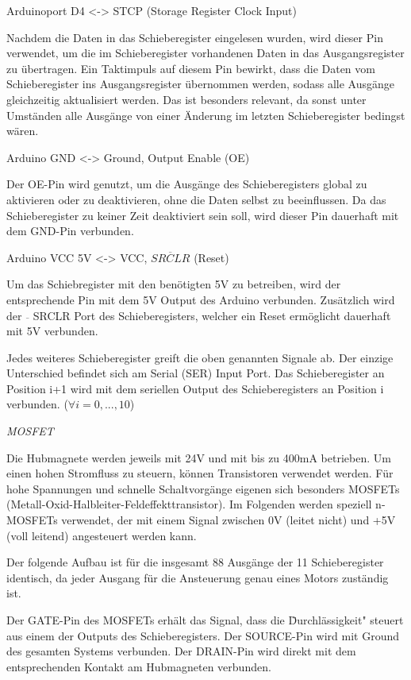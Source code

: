 Arduinoport D4 <-> STCP (Storage Register Clock Input)

Nachdem die Daten in das Schieberegister eingelesen wurden, wird dieser Pin verwendet, um die im Schieberegister vorhandenen Daten in das Ausgangsregister zu übertragen.
Ein Taktimpuls auf diesem Pin bewirkt, dass die Daten vom Schieberegister ins Ausgangsregister übernommen werden, sodass alle Ausgänge gleichzeitig aktualisiert werden.
Das ist besonders relevant, da sonst unter Umständen alle Ausgänge von einer Änderung im letzten Schieberegister bedingst wären.

Arduino GND <-> Ground, Output Enable (OE)

Der OE-Pin wird genutzt, um die Ausgänge des Schieberegisters global zu aktivieren oder zu deaktivieren, ohne die Daten selbst zu beeinflussen.
Da das Schieberegister zu keiner Zeit deaktiviert sein soll, wird dieser Pin dauerhaft mit dem GND-Pin verbunden.

Arduino VCC 5V <-> VCC, $\overline{SRCLR}$ (Reset)

Um das Schiebregister mit den benötigten 5V zu betreiben, wird der entsprechende Pin mit dem 5V Output des Arduino verbunden.
Zusätzlich wird der $\overline{ }$ SRCLR Port des Schieberegisters, welcher ein Reset ermöglicht dauerhaft mit 5V verbunden.

Jedes weiteres Schieberegister greift die oben genannten Signale ab.
Der einzige Unterschied befindet sich am Serial (SER) Input Port.
Das Schieberegister an Position i+1 wird mit dem seriellen Output des Schieberegisters an Position i verbunden. ($\forall i = 0,...,10$)

\textit{MOSFET}

Die Hubmagnete werden jeweils mit 24V und mit bis zu 400mA betrieben.
Um einen hohen Stromfluss zu steuern, können Transistoren verwendet werden.
Für hohe Spannungen und schnelle Schaltvorgänge eigenen sich besonders MOSFETs (Metall-Oxid-Halbleiter-Feldeffekttransistor).
Im Folgenden werden speziell n-MOSFETs verwendet, der mit einem Signal zwischen 0V (leitet nicht) und +5V (voll leitend) angesteuert werden kann.

Der folgende Aufbau ist für die insgesamt 88 Ausgänge der 11 Schieberegister identisch, da jeder Ausgang für die Ansteuerung genau eines Motors zuständig ist.

Der GATE-Pin des MOSFETs erhält das Signal, dass die \"Durchlässigkeit" steuert aus einem der Outputs des Schieberegisters.
Der SOURCE-Pin wird mit Ground des gesamten Systems verbunden.
Der DRAIN-Pin wird direkt mit dem entsprechenden Kontakt am Hubmagneten verbunden.

